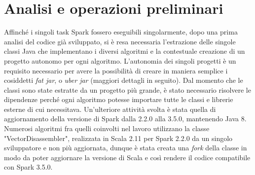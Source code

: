 \documentclass[12pt,a4paper,fleqn,titlepage]{report}
\begin{document}
    \section{Analisi e operazioni preliminari}
        Affinché i singoli task Spark fossero eseguibili singolarmente, dopo una prima analisi del codice già sviluppato, si è resa necessaria l'estrazione delle singole classi Java che implementano i diversi algoritmi e la contestuale creazione di un progetto autonomo per ogni algoritmo.
        L'autonomia dei singoli progetti è un requisito necessario per avere la possibilità di creare in maniera semplice i cosiddetti \emph{fat jar}, o \emph{uber jar} (maggiori dettagli in seguito). Dal momento che le classi sono state estratte da un progetto più grande, è stato necessario risolvere le dipendenze perché ogni algoritmo potesse importare tutte le classi e librerie esterne di cui necessitava.
        Un'ulteriore attività svolta è stata quella di aggiornamento della versione di Spark dalla 2.2.0 alla 3.5.0, mantenendo Java 8.
        Numerosi algoritmi fra quelli coinvolti nel lavoro utilizzano la classe "VectorDisassembler", realizzata in Scala 2.11 per Spark 2.2.0 da un singolo sviluppatore e non più aggiornata, dunque è stata creata una \emph{fork} della classe in modo da poter aggiornare la versione di Scala e così rendere il codice compatibile con Spark 3.5.0.
\end{document}
